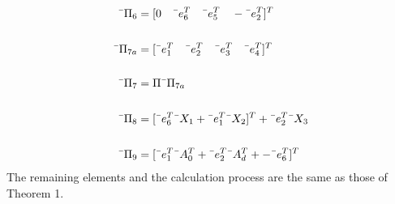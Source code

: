 \documentclass[journal]{IEEEtran}
\begin{document}
\begin{align}
\text{\={$\Pi_{6}$}} &= [0 \quad \text{\={$e^{T}_{6}$}} \quad \text{\={$e^{T}_{5}$}} \quad -\text{\={$e^{T}_{2}$}}]^T \\ \\
\text{\={$\Pi_{7a}$}} &= [\text{\={$e^{T}_{1}$}} \quad \text{\={$e^{T}_{2}$}} \quad \text{\={$e^{T}_{3}$}} \quad \text{\={$e^{T}_{4}$}}]^T \\ \\
\text{\={$\Pi_{7}$}} &= \Pi\text{\={$\Pi_{7a}$}} \\ \\
\text{\={$\Pi_{8}$}} &= [\text{\={$e^{T}_{6}$}}\text{\={$X_{1}$}} + \text{\={$e^{T}_{1}$}}\text{\={$X_{2}$}}]^T + \text{\={$e^{T}_{2}$}}\text{\={$X_{3}$}} \\ \\
\text{\={$\Pi_{9}$}} &= [\text{\={$e^{T}_{1}$}}\text{\={$A^{T}_{0}$}} + \text{\={$e^{T}_{2}$}}\text{\={$A^{T}_{d}$}} + -\text{\={$e^{T}_{6}$}}]^T \\
\end{align}
The remaining elements and the calculation process are the same as those of Theorem 1.
\end{document}
